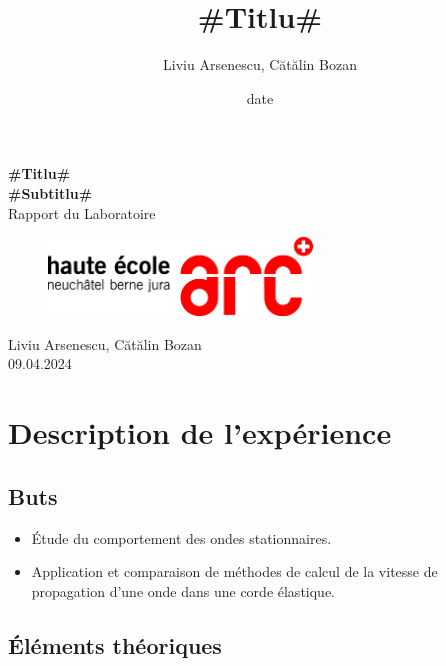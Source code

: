 \documentclass[12pt,a4paper]{article}
\title{#Titlu#}
\author{Liviu Arsenescu, Cătălin Bozan}
\date{date}
\begin{document}
    \begin{titlepage}
        \begin{center}
            \vspace*{\fill}
            \Huge \textbf{#Titlu#} \\
            \Huge \textbf{#Subtitlu#} \\
            \Large Rapport du Laboratoire \\
            \begin{figure}[h]
                \centering
                \includegraphics[width=7cm]{hearclogo.png}
            \end{figure}
            \vspace{\fill}
            \Large Liviu Arsenescu, Cătălin Bozan \\
            09.04.2024

            \vspace*{\fill}
        \end{center}
    \end{titlepage}

    \thispagestyle{empty}
    \tableofcontents
    \newpage

    \section{Description de l'expérience}
    \subsection{Buts}
    \begin{itemize}
        \item Étude du comportement des ondes stationnaires.
        \item Application et comparaison de méthodes de calcul de la vitesse de propagation d'une onde dans une corde élastique.
    \end{itemize}

    \subsection{Éléments théoriques}
\end{document}
